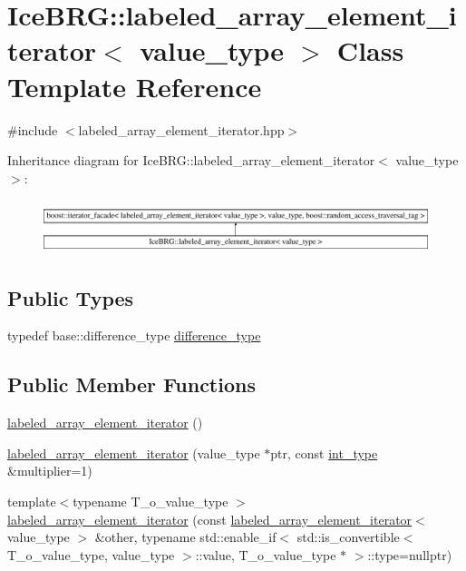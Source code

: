 \hypertarget{classIceBRG_1_1labeled__array__element__iterator}{}\section{Ice\+B\+R\+G\+:\+:labeled\+\_\+array\+\_\+element\+\_\+iterator$<$ value\+\_\+type $>$ Class Template Reference}
\label{classIceBRG_1_1labeled__array__element__iterator}


{\ttfamily \#include $<$labeled\+\_\+array\+\_\+element\+\_\+iterator.\+hpp$>$}

Inheritance diagram for Ice\+B\+R\+G\+:\+:labeled\+\_\+array\+\_\+element\+\_\+iterator$<$ value\+\_\+type $>$\+:\begin{figure}[H]
\begin{center}
\leavevmode
\includegraphics[height=1.568627cm]{classIceBRG_1_1labeled__array__element__iterator}
\end{center}
\end{figure}
\subsection*{Public Types}
\begin{DoxyCompactItemize}
\item 
typedef base\+::difference\+\_\+type \hyperlink{classIceBRG_1_1labeled__array__element__iterator_acd537ab832f1eb85fb69f1653ad208c5}{difference\+\_\+type}
\end{DoxyCompactItemize}
\subsection*{Public Member Functions}
\begin{DoxyCompactItemize}
\item 
\hyperlink{classIceBRG_1_1labeled__array__element__iterator_a7f33ffdec6e7a0585b07c8947907bffe}{labeled\+\_\+array\+\_\+element\+\_\+iterator} ()
\item 
\hyperlink{classIceBRG_1_1labeled__array__element__iterator_afa3c49499457f050f6d30e7161083fc7}{labeled\+\_\+array\+\_\+element\+\_\+iterator} (value\+\_\+type $\ast$ptr, const \hyperlink{lib_2IceBRG__main_2common_8h_ac4de9d9335536ac22821171deec8d39e}{int\+\_\+type} \&multiplier=1)
\item 
{\footnotesize template$<$typename T\+\_\+o\+\_\+value\+\_\+type $>$ }\\\hyperlink{classIceBRG_1_1labeled__array__element__iterator_ad2e8da30ea6d98f79a94282a50d00388}{labeled\+\_\+array\+\_\+element\+\_\+iterator} (const \hyperlink{classIceBRG_1_1labeled__array__element__iterator}{labeled\+\_\+array\+\_\+element\+\_\+iterator}$<$ value\+\_\+type $>$ \&other, typename std\+::enable\+\_\+if$<$ std\+::is\+\_\+convertible$<$ T\+\_\+o\+\_\+value\+\_\+type, value\+\_\+type $>$\+::value, T\+\_\+o\+\_\+value\+\_\+type $\ast$ $>$\+::type=nullptr)
\end{DoxyCompactItemize}
